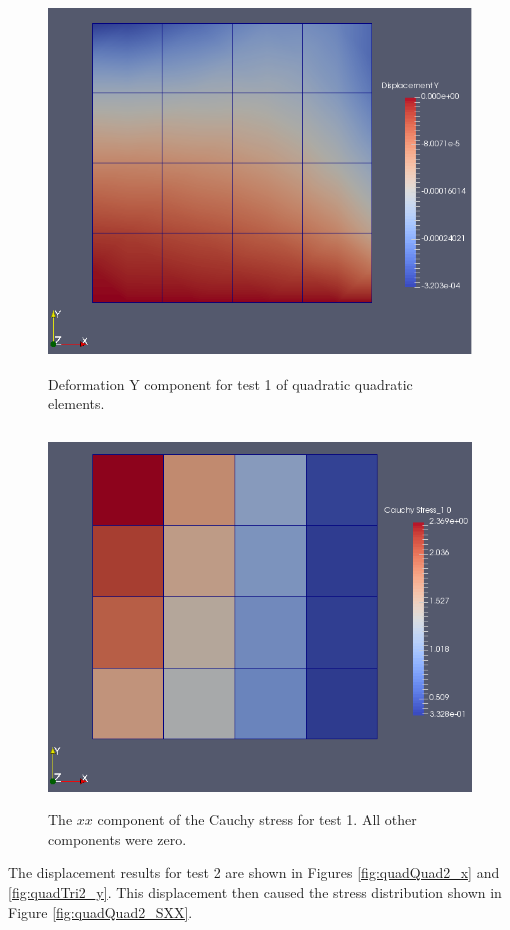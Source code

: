 \documentclass[a4paper, 12pt]{article}
\begin{document}
\begin{figure}[H]
  \centering
  \includegraphics[width=13cm, height=10cm]{Qquad_4_t1_disp_Y}
  \caption{Deformation Y component for test 1 of quadratic
            quadratic elements.}
  \label{fig:quadQuad1_y}
\end{figure}

\begin{figure}[H]
  \centering
  \includegraphics[width=13cm, height=10cm]{Qquad_4_t1_Sxx}
  \caption{The $xx$ component of the Cauchy stress for test 1.
            All other components were zero.}
  \label{fig:quadQuad1_SXX}
\end{figure}

The displacement results for test 2 are shown in 
Figures \ref{fig:quadQuad2_x} and \ref{fig:quadTri2_y}.
This displacement then caused the stress distribution 
shown in Figure \ref{fig:quadQuad2_SXX}.
\end{document}
